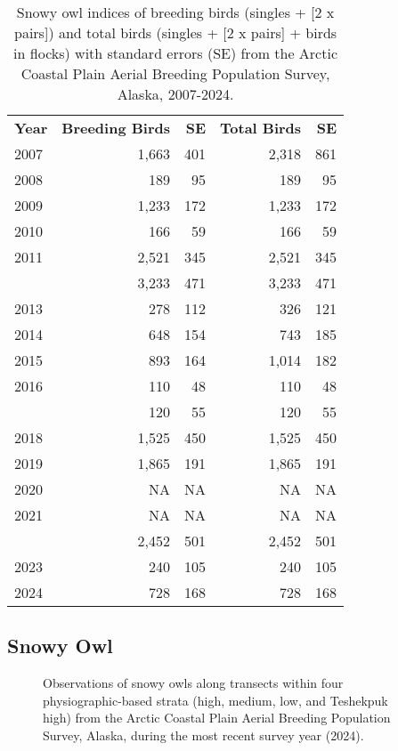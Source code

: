 \documentclass[
]{article}
\begin{document}
\begin{longtable}[t]{lrrrr}

\caption{\label{tbl-SNOW}Snowy owl indices of breeding birds (singles +
{[}2 x pairs{]}) and total birds (singles + {[}2 x pairs{]} + birds in
flocks) with standard errors (SE) from the Arctic Coastal Plain Aerial
Breeding Population Survey, Alaska, 2007-2024.}

\tabularnewline

\\
\toprule
\textbf{Year} & \textbf{Breeding Birds} & \textbf{SE} & \textbf{Total Birds} & \textbf{SE}\\
\midrule
2007 & 1,663 & 401 & 2,318 & 861\\
2008 & 189 & 95 & 189 & 95\\
2009 & 1,233 & 172 & 1,233 & 172\\
2010 & 166 & 59 & 166 & 59\\
2011 & 2,521 & 345 & 2,521 & 345\\
\addlinespace
2012 & 3,233 & 471 & 3,233 & 471\\
2013 & 278 & 112 & 326 & 121\\
2014 & 648 & 154 & 743 & 185\\
2015 & 893 & 164 & 1,014 & 182\\
2016 & 110 & 48 & 110 & 48\\
\addlinespace
2017 & 120 & 55 & 120 & 55\\
2018 & 1,525 & 450 & 1,525 & 450\\
2019 & 1,865 & 191 & 1,865 & 191\\
2020 & NA & NA & NA & NA\\
2021 & NA & NA & NA & NA\\
\addlinespace
2022 & 2,452 & 501 & 2,452 & 501\\
2023 & 240 & 105 & 240 & 105\\
2024 & 728 & 168 & 728 & 168\\
\bottomrule

\end{longtable}

\endgroup{}

\newpage{}

\subsection*{Snowy Owl}\label{snowy-owl-2}

\begin{figure}


\caption{\label{fig-SNOWmap}Observations of snowy owls along transects
within four physiographic-based strata (high, medium, low, and Teshekpuk
high) from the Arctic Coastal Plain Aerial Breeding Population Survey,
Alaska, during the most recent survey year (2024).}

\end{figure}%
\end{document}
